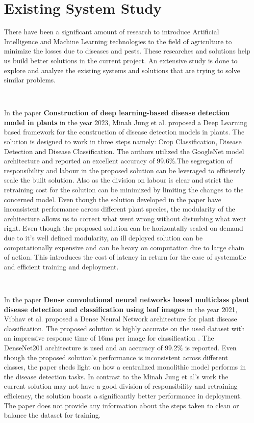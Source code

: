 \label{chap.2}


\section{Existing System Study}

There have been a significant amount of research to introduce Artificial Intelligence and Machine Learning technologies to the field of agriculture to minimize the losses due to diseases and pests. These researches and solutions help us build better solutions in the current project. An extensive study is done to explore and analyze the existing systems and solutions that are trying to solve similar problems.

\

In the paper \textbf{Construction of deep learning-based disease detection model in plants} in the year 2023, Minah Jung et al. proposed a Deep Learning based framework for the construction of disease detection models in plants. The solution is designed to work in three steps namely: Crop Classification, Disease Detection and Disease Classification\cite{jung2023construction}. The authors utilized the GoogleNet model architecture and reported an excellent accuracy of 99.6\%.The segregation of responsibility and labour in the proposed solution can be leveraged to efficiently scale the built solution. Also as the division on labour is clear and strict the retraining cost for the solution can be minimized by limiting the changes to the concerned model. Even though the solution developed in the paper have inconsistent performance across different plant species, the modularity of the architecture allows us to correct what went wrong without disturbing what went right. Even though the proposed solution can be horizontally scaled on demand due to it's well defined modularity, an ill deployed solution can be computationally expensive and can be heavy on computation due to large chain of action. This introduces the cost of latency in return for the ease of systematic and efficient training and deployment. 

\

In the paper \textbf{Dense convolutional neural networks based multiclass plant disease detection and classification using leaf images } in the year 2021, Vibhav et al. proposed a Dense Neural Network architecture for plant disease classification. The proposed solution is highly accurate on the used dataset with an impressive response time of 16ms per image for classification \cite{tiwari2021dense}. The DenseNet201 architecture is used and an accuracy of 99.2\% is reported. Even though the proposed solution's performance is inconsistent across different classes, the paper sheds light on how a centralized monolithic model performs in the disease detection tasks. In contrast to the Minah Jung et al's work the current solution may not have a good division of responsibility and retraining efficiency, the solution boasts a significantly better performance in deployment. The paper does not provide any information about the steps taken to clean or balance the dataset for training.

